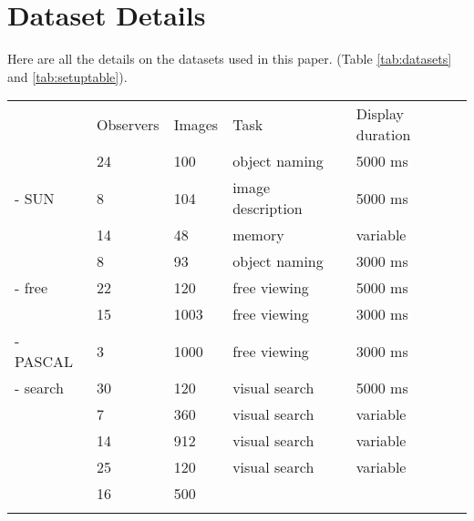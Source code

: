 \section{Dataset Details}

Here are all the details on the datasets used in this paper. (Table \ref{tab:datasets} and \ref{tab:setuptable}).


\begin{table*}
\centering
\small
\begin{tabular}{l|llll}
 						& Observers & Images &  Task & Display duration\\
\cite{clarke2013}     	& 24   	& 100   & object naming & 5000 ms\\
\cite{yun2013} - SUN    & 8     & 104   & image description & 5000 ms\\
\cite{tatler2005}     	& 14    & 48    & memory 			& variable\\
\cite{einhauser2008} 	& 8		& 93    & object naming 	& 3000 ms \\
\cite{tatler2007} - free & 22   & 120   & free viewing      & 5000 ms\\
\cite{judd2009}         & 15 	& 1003  & free viewing 		& 3000 ms\\
\cite{yun2013} - PASCAL & 3 	& 1000  & free viewing 		& 3000 ms\\
\cite{tatler2007} - search & 30 & 120	& visual search 	& 5000 ms\\
\hline
\cite{clarke2009} 		& 7		& 360	& visual search 	& variable\\
\cite{ehinger2009}     	& 14 	& 912 	& visual search 	& variable\\
\cite{asher2013}    	& 25    & 120   & visual search		& variable\\
\cite{jiang2014}  		& 16 	& 500 	& & \\
\cite{borji2015}  		& & & & \\
\end{tabular}

\caption{Summary of the 13 datasets used throughout this study.}
\label{tab:datasets}
\end{table*}

